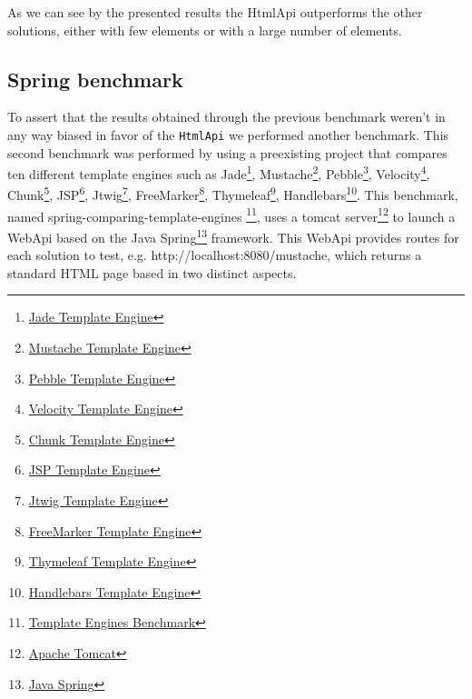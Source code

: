 
\noindent
As we can see by the presented results the HtmlApi outperforms the other solutions, either with few elements or with a large number of elements. 

\subsection{Spring benchmark}
\label{sec:springbenchmark}

To assert that the results obtained through the previous benchmark weren't in any way biased in favor of the \texttt{HtmlApi} we performed another benchmark. This second benchmark was performed by using a preexisting project that compares ten different template engines such as Jade\footnote{\href{http://jade-lang.com/}{Jade Template Engine}}, Mustache\footnote{\href{https://mustache.github.io/}{Mustache Template Engine}}, Pebble\footnote{\href{http://www.mitchellbosecke.com/pebble/home}{Pebble Template Engine}}, Velocity\footnote{\href{http://velocity.apache.org/}{Velocity Template Engine}}, Chunk\footnote{\href{http://www.x5software.com/chunk/examples/ChunkExample}{Chunk Template Engine}}, JSP\footnote{\href{http://www.oracle.com/technetwork/java/index-jsp-138231.html}{JSP Template Engine}}, Jtwig\footnote{\href{http://jtwig.org/}{Jtwig Template Engine}}, FreeMarker\footnote{\href{https://freemarker.apache.org/}{FreeMarker Template Engine}}, Thymeleaf\footnote{\href{https://www.thymeleaf.org/}{Thymeleaf Template Engine}}, Handlebars\footnote{\href{https://handlebarsjs.com/}{Handlebars Template Engine}}. This benchmark, named spring-comparing-template-engines \footnote{\href{https://github.com/jreijn/spring-comparing-template-engines}{Template Engines Benchmark}}, uses a tomcat server\footnote{\href{http://tomcat.apache.org/}{Apache Tomcat}} to launch a WebApi based on the Java Spring\footnote{\href{https://spring.io/}{Java Spring}} framework. This WebApi provides routes for each solution to test, e.g. http://localhost:8080/mustache, which returns a standard \ac{HTML} page based in two distinct aspects. 

